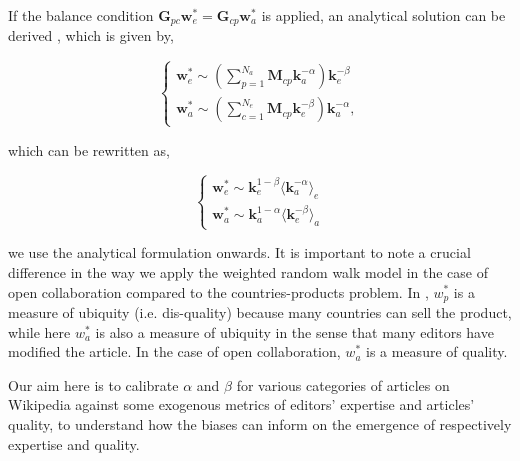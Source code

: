 If the balance condition $\mathbf{G}_{pc} \mathbf{w}^*_e = \mathbf{G}_{cp} \mathbf{w}^*_a$
is applied, an analytical solution can be derived \cite{caldarelli2012network}, which is given by,

\begin{equation}
\begin{cases}
 \mathbf{w}^*_e \sim (\sum^{N_a}_{p=1} \mathbf{M}_{cp} \mathbf{k}_a^{-\alpha}) \mathbf{k}_e^{-\beta} \\
\mathbf{w}^*_a \sim (\sum^{N_e}_{c=1} \mathbf{M}_{cp} \mathbf{k}_e^{-\beta}) \mathbf{k}_a^{-\alpha},
\end{cases}
\end{equation}

which can be rewritten as,

\begin{equation}
\begin{cases}
\mathbf{w}^{*}_{e} \sim \mathbf{k}^{1-\beta}_{e} \langle \mathbf{k}_{a}^{-\alpha}\rangle_e \\
\mathbf{w}^{*}_{a} \sim \mathbf{k}^{1-\alpha}_{a} \langle \mathbf{k}_{e}^{-\beta}\rangle_a
\end{cases} \label{eqsim}
\end{equation}


we use the analytical formulation onwards. It is important to note a crucial difference in the way we apply the weighted random walk model in the case of open collaboration compared to the countries-products problem. In \cite{caldarelli2012network}, $w^*_p$ is a measure of ubiquity (i.e. dis-quality) because many countries can sell the product, while here $w^*_a$ is also a measure of ubiquity in the sense that many editors have modified the article. In the case of open collaboration, $w^*_a$ is a measure of quality.

Our aim here is to calibrate $\alpha$ and $\beta$ for various categories of articles on Wikipedia against some exogenous metrics of editors' expertise and articles' quality, to understand how the biases can inform on the emergence of respectively expertise and quality.